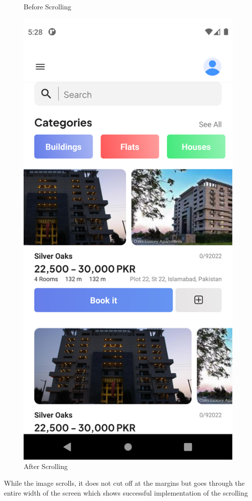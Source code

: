 \begin{figure}[!htb]
\begin{minipage}{0.48\textwidth}
		\caption{Before Scrolling}\label{Fig:Data1}
	\end{minipage}\hfill
	\begin{minipage}{0.48\textwidth}
		\centering
		\includegraphics[width=0.7\linewidth]{figures/Testing/scroll2.png}
		\caption{After Scrolling}\label{Fig:Data2}
	\end{minipage}
\end{figure}
While the image scrolls, it does not cut off at the margins but goes through the entire width of the screen which shows successful implementation of the scrolling
\newpage
